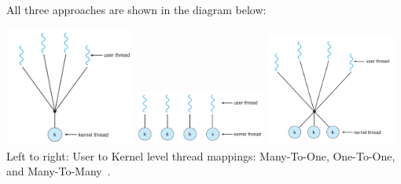 All three approaches are shown in the diagram below:

\begin{center}
	\includegraphics[width=0.32\textwidth]{images/threads-manytoone.png}
	\includegraphics[width=0.32\textwidth]{images/threads-onetoone.png}
	\includegraphics[width=0.32\textwidth]{images/threads-manytomany.png}\\
	Left to right: User to Kernel level thread mappings: Many-To-One, One-To-One, and Many-To-Many~\cite{osc}.
\end{center}



